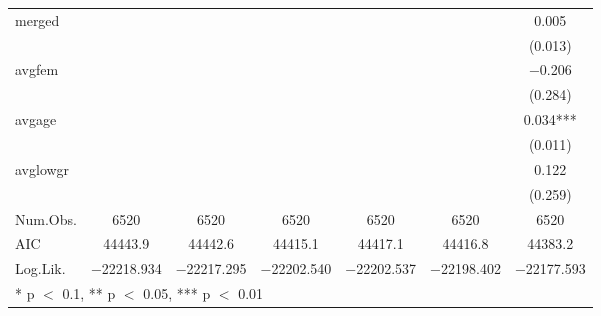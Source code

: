 \documentclass[
]{article}
\begin{document}
\begin{table}[!h]
{\begin{tabular}[t]{lcccccc}
merged &  &  &  &  &  & \num{0.005}\\
 &  &  &  &  &  & (\num{0.013})\\
avgfem &  &  &  &  &  & \num{-0.206}\\
 &  &  &  &  &  & (\num{0.284})\\
avgage &  &  &  &  &  & \num{0.034}***\\
 &  &  &  &  &  & (\num{0.011})\\
avglowgr &  &  &  &  &  & \num{0.122}\\
 &  &  &  &  &  & (\num{0.259})\\
\midrule
Num.Obs. & \num{6520} & \num{6520} & \num{6520} & \num{6520} & \num{6520} & \num{6520}\\
AIC & \num{44443.9} & \num{44442.6} & \num{44415.1} & \num{44417.1} & \num{44416.8} & \num{44383.2}\\
Log.Lik. & \num{-22218.934} & \num{-22217.295} & \num{-22202.540} & \num{-22202.537} & \num{-22198.402} & \num{-22177.593}\\
\bottomrule
\multicolumn{7}{l}{\rule{0pt}{1em}* p $<$ 0.1, ** p $<$ 0.05, *** p $<$ 0.01}\\
\end{tabular}}
\end{table}

\clearpage
\end{document}
